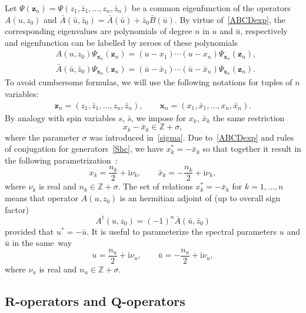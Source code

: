 \documentclass[10pt,a4paper]{amsart}
\renewcommand{\imath}{\mathrm{i}}
\numberwithin{equation}{section}
\begin{document}
Let $\Psi(\bm z_n) = \Psi(z_1,\bar z_1,\dots, z_n,\bar z_n)$
be a common eigenfunction of the operators
$A(u,z_0)$ and $\bar{A}(\bar{u},\bar{z}_0) = \bar{A}(\bar{u})+\bar{z}_0 \bar{B}(\bar{u})$.
By virtue of~\eqref{ABCDexp}, the corresponding eigenvalues are
polynomials of degree $n$ in $u$ and $\bar u$, respectively and
eigenfunction can be labelled by zeroes of these polynomials
\begin{align}
&A(u,z_0)
\Psi_{\bm x_n }(\bm z_n)= (u-x_1)\cdots(u-x_n)
\Psi_{\bm x_n }(\bm z_n),
\nonumber\\
&\bar{A}(\bar{u},\bar{z}_0) \Psi_{\bm x_n }(\bm z_n)=
(\bar u-\bar x_1)\cdots(\bar u-\bar x_n)
\Psi_{\bm x_n }(\bm z_n).\label{AbAN}
\end{align}
To avoid cumbersome formulas, we will use the following
notations for tuples of $n$ variables:
\begin{align*}
\bm z_n=(z_1,\bar{z}_1, \dots, z_n, \bar{z}_n) , \qquad
\bm x_n=(x_1,\bar{x}_1, \dots, x_n, \bar{x}_n).
\end{align*}
By analogy with spin variables $s$, $\bar{s}$, we
impose for $x_k$, $\bar x_k$ the same restriction
\begin{equation*}
x_k-\bar x_k \in \mathbb{Z}+\sigma,
\end{equation*}
where the parameter $\sigma$ was introduced in~\eqref{sigma}.
Due to~\eqref{ABCDexp} and rules of conjugation for generators~\eqref{Shc}, we have $x_k^*=-\bar{x}_k$ so that together it result
in the following parametrization~\cite{DKM}:%
\begin{equation}\label{x-n-nu}
x_k=\frac{n_k}{2}+\imath\nu_k,\qquad \bar x_k=-\frac{n_k}{2}+\imath\nu_k ,
\end{equation}
where $\nu_k$ is real and $n_k \in \mathbb{Z}+\sigma$.
The set of relations $x_k^*=-\bar{x}_k$ for $k=1 ,\dots , n $
means that operator $A(u,z_0)$ is an hermitian adjoint
of  (up to overall sign factor)
\begin{equation*}
A^\dagger(u,z_0) = (-1)^n \bar A(\bar u, \bar{z}_0)
\end{equation*}
provided that $u^*=-\bar u$. It is useful to
parameterize the spectral parameters $u$ and $\bar{u}$ in the same~way
\begin{equation*}
u=\frac{n_u}{2}+\imath\nu_u,\qquad \bar u = -\frac{n_u}{2}+\imath\nu_u ,
\end{equation*}
where $\nu_u$ is real and $n_u \in \mathbb{Z}+\sigma$.

\subsection[R-operators and Q-operators]{$\boldsymbol{R}$-operators and $\boldsymbol{Q}$-operators}%
\end{document}
